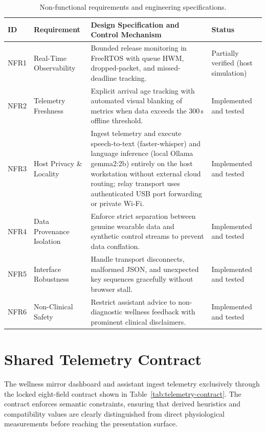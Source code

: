 \begin{table}[H]
\centering
\scriptsize
\renewcommand{\arraystretch}{0.98}
\caption{Non-functional requirements and engineering specifications.}
\label{tab:nonfunctional-requirements}
\begin{tabularx}{\textwidth}{p{9mm}p{30mm}p{56mm}Y}
\toprule
\textbf{ID} & \textbf{Requirement} & \textbf{Design Specification and Control Mechanism} & \textbf{Status}\\
\midrule
NFR1 & Real-Time Observability & Bounded release monitoring in FreeRTOS with queue HWM, dropped-packet, and missed-deadline tracking. & Partially verified (host simulation)\\
NFR2 & Telemetry Freshness & Explicit arrival age tracking with automated visual blanking of metrics when data exceeds the 300\,s offline threshold. & Implemented and tested\\
NFR3 & Host Privacy \& Locality & Ingest telemetry and execute speech-to-text (faster-whisper) and language inference (local Ollama gemma2:2b) entirely on the host workstation without external cloud routing; relay transport uses authenticated USB port forwarding or private Wi-Fi. & Implemented and tested\\
NFR4 & Data Provenance Isolation & Enforce strict separation between genuine wearable data and synthetic control streams to prevent data conflation. & Implemented and tested\\
NFR5 & Interface Robustness & Handle transport disconnects, malformed JSON, and unexpected key sequences gracefully without browser stall. & Implemented and tested\\
NFR6 & Non-Clinical Safety & Restrict assistant advice to non-diagnostic wellness feedback with prominent clinical disclaimers. & Implemented and tested\\
\bottomrule
\end{tabularx}
\end{table}

\section{Shared Telemetry Contract}
The wellness mirror dashboard and assistant ingest telemetry exclusively through the locked eight-field contract shown in Table~\ref{tab:telemetry-contract}. The contract enforces semantic constraints, ensuring that derived heuristics and compatibility values are clearly distinguished from direct physiological measurements before reaching the presentation surface.

